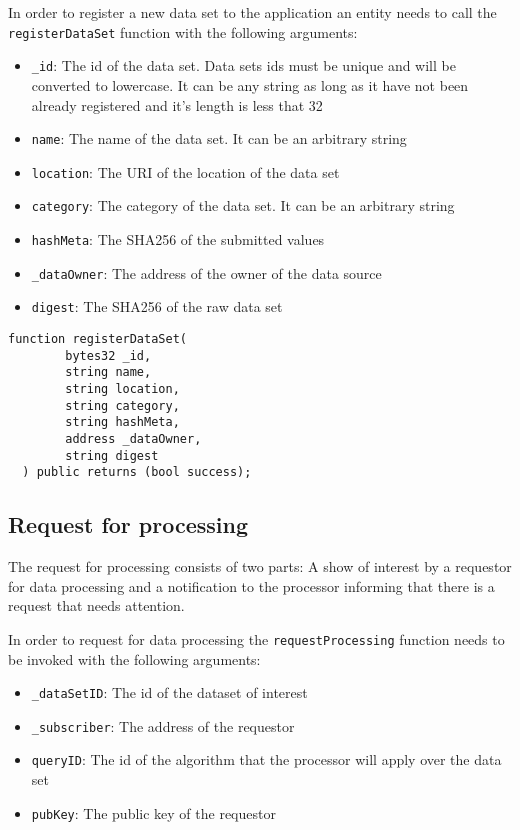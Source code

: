 In order to register a new data set to the application an entity needs to call the \verb|registerDataSet| function with the following arguments:

\begin{itemize}
  \item \verb|_id|: The id of the data set. Data sets ids must be unique and will be converted to lowercase. It can be any string as long as it have not been already registered and it's length is less that 32
  \item \verb|name|: The name of the data set. It can be an arbitrary string
  \item \verb|location|: The URI of the location of the data set
  \item \verb|category|: The category of the data set. It can be an arbitrary string
  \item \verb|hashMeta|: The SHA256 of the submitted values
  \item \verb|_dataOwner|: The address of the owner of the data source
  \item \verb|digest|: The SHA256 of the raw data set
\end{itemize}

\begin{lstlisting}[language=Solidity, caption={Data set registration function}]
  function registerDataSet(
        bytes32 _id,
        string name,
        string location,
        string category,
        string hashMeta,
        address _dataOwner,
        string digest
  ) public returns (bool success);
\end{lstlisting}

\subsection{Request for processing}
\label{implemenation:contracts:req_pr}

The request for processing consists of two parts: A show of interest by a requestor for data processing and a notification to the processor informing that there is a request that needs attention.

In order to request for data processing the \verb|requestProcessing| function needs to be invoked with the following arguments:

\begin{itemize}
  \item \verb|_dataSetID|: The id of the dataset of interest
  \item \verb|_subscriber|: The address of the requestor
  \item \verb|queryID|: The id of the algorithm that the processor will apply over the data set
  \item \verb|pubKey|: The public key of the requestor
\end{itemize}

